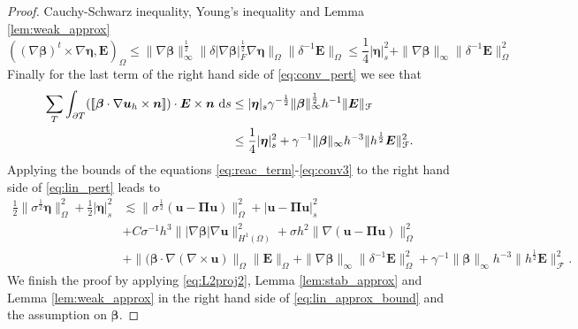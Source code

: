 \documentclass[10pt]{amsart}
\numberwithin{equation}{section}
\theoremstyle{definition}
\theoremstyle{remark}
\renewcommand{\(}{\bigl(}
\renewcommand{\)}{\bigr)}
\newcommand{\jump}[1]{\left[\hspace{-0.025in}\left[#1\right]\hspace{-0.025in}\right]}
\newcommand{\bld}[1]{\boldsymbol{#1}}
\newcommand{\bn}{\bld{n}}
\newcommand{\bu}{\bld{u}}
\newcommand{\bE}{\bld{E}}
\newcommand{\bldeta}{\bld{\eta}}
\newcommand{\bPi}{\bld{\Pi}}
\newcommand{\bbeta}{{\bm \beta}}
\begin{document}
\begin{proof}
Cauchy-Schwarz inequality, Young's inequality and Lemma \ref{lem:weak_approx}
\begin{equation}\label{eq:conv2}
((\nabla \bbeta)^t\times \nabla \bldeta, \bE)_\Omega \leq \|\nabla
\bbeta\|^{\frac12}_{\infty} \|\delta |\nabla
\bbeta|_F^{\frac12} \nabla \bldeta\|_\Omega \|\delta^{-1} \bE\|_\Omega
\leq \frac14 |\bldeta|_s^2+ \|\nabla \bbeta\|_{\infty}\|\delta^{-1} \bE\|_\Omega^2
\end{equation}
Finally for the last term of the right hand side of
\eqref{eq:conv_pert} we see that 
\begin{align}\label{eq:conv3}
\sum_T \int_{\partial T} (\jump{\bbeta \cdot \nabla \bu_h\times \bn}) \cdot \bE \times
\bn ~\mbox{d}s &\leq |\bldeta|_s
\gamma^{-\frac12}\|\bbeta\|_{\infty}^{\frac12}h^{-1} \|
\bE\|_{\mathcal{F}} 
\\ \nonumber
&\leq
\frac14 |\bldeta|_s^2 + \gamma^{-1}\|\bbeta\|_{\infty}h^{-3} \|
h^{\frac12} \bE\|_{\mathcal{F}}^2.
\end{align}
Applying the bounds of the equations \eqref{eq:reac_term}-\eqref{eq:conv3} to the
right hand side of \eqref{eq:lin_pert} leads to
\begin{align}\label{eq:lin_approx_bound}
\frac12 \|\sigma^{\frac12} \bldeta\|^2_\Omega + \frac12 |\bldeta|_s^2
&\lesssim \|\sigma^{\frac12}(\bu -
\bPi \bu)\|^2_\Omega +  |\bu - \bPi
\bu|_s^2
\\ \nonumber
&+ C \sigma^{-1} h^{3} \||\nabla
\bbeta| \nabla \bu\|_{H^1(\Omega)}^2+\sigma h^2 \|\nabla (\bu -
\bPi \bu)\|^2_{\Omega}  
\\ \nonumber
&+\|(\bbeta
\cdot \nabla (\nabla \times\bu)\|_\Omega \|\bE\|_\Omega+ \|\nabla \bbeta\|_{\infty}\|\delta^{-1} \bE\|_\Omega^2+\gamma^{-1}\|\bbeta\|_{\infty}h^{-3} \|
h^{\frac12} \bE\|_{\mathcal{F}}^2.
\end{align}
We finish the proof by applying \eqref{eq:L2proj2}, Lemma
\ref{lem:stab_approx} and Lemma \ref{lem:weak_approx} in the right
hand side of \eqref{eq:lin_approx_bound} and the assumption on $\bbeta$.
\end{proof}
\end{document}
